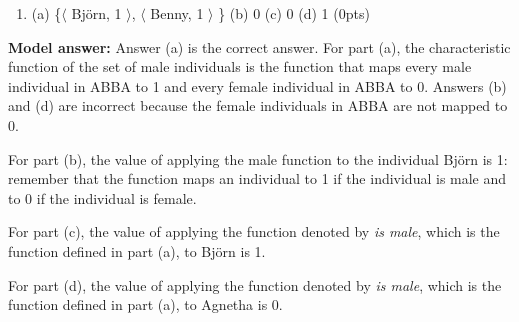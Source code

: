 \documentclass[a4,11pt]{article}
\begin{document}
\begin{enumerate}[leftmargin = 12pt]
\begin{enumerate}[noitemsep]
       \item (a) \{$\langle$ Bj\"orn, 1 $\rangle$, $\langle$ Benny, 1 $\rangle$ \} (b) 0 (c)  0 (d) 1 (0pts)
         
\end{enumerate}

{\bf Model answer:} Answer (a) is the correct answer. For part (a), the characteristic function of the set of male individuals is the function that maps every male individual in ABBA to 1 and every female individual in ABBA to 0. Answers (b) and (d) are incorrect because the female individuals in ABBA are not mapped to 0. 

For part (b), the value of applying the {\sf male} function to the individual Bj\"orn is 1: remember that the function maps an individual to 1 if the individual is male and to 0 if the individual is female.

For part (c), the value of applying the function denoted by {\em is male}, which is the function defined in part (a), to Bj\"orn is 1.

For part (d), the value of applying the function denoted by {\em is male}, which is the function defined in part (a), to Agnetha is 0.

\end{enumerate}
\end{document}

